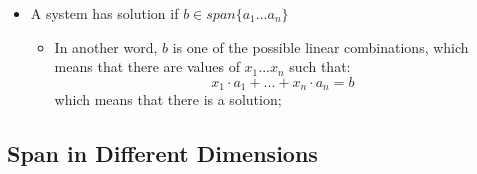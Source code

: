   \begin{itemize}
    {An expression constructed from a set of terms by multiplying each term
    by a constant and adding the results};
    \begin{itemize}
      \item To say $ b $ is a linear combination of $ a_{1}, a_{2}, a_{1} $
      is to say that there are weights (\textbf{multipliers}) $ x_{1}, x_{2}, x_{3} $ such that 
      $ a_{1} \cdot x_{1} + a_{2} \cdot x_{2} + a_{3} \cdot x_{3} = b $;
      \begin{displaymath}
        a_{1} =
        \begin{bmatrix}
          ? \\
          ? \\ 
          ? \\
        \end{bmatrix},
        a_{2} = 
        \begin{bmatrix}
          ? \\
          ? \\ 
          ? \\
        \end{bmatrix},
        a_{3} = 
        \begin{bmatrix}
          ? \\
          ? \\ 
          ? \\
        \end{bmatrix}
      \end{displaymath}
    \end{itemize}
    
    ;
    \item A system has solution if $ b \in span \{ a_{1} ... a_{n} \} $
    \begin{itemize}
      \item In another word, $ b $ is one of the possible linear combinations,
      which means that there are values of $ x_{1} ... x_{n} $ such that:
      \begin{displaymath}
        x_{1} \cdot a_{1} + ... + x_{n} \cdot a_{n} = b
      \end{displaymath}
      which means that there is a solution;
    \end{itemize}
  \end{itemize}
  

  
\subsection{Span in Different Dimensions}

